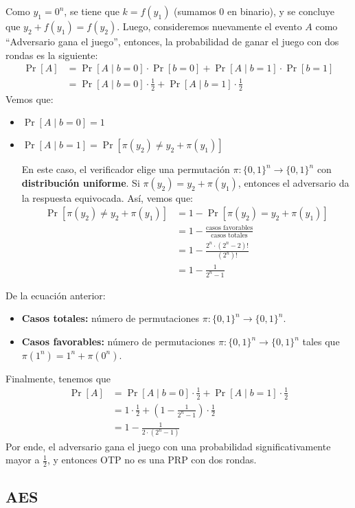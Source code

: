 Como $y_1 = 0^n$, se tiene que $k = f(y_1)$ (sumamos 0 en binario), y se concluye que $y_2 + f(y_1) = f(y_2)$. Luego, consideremos nuevamente el evento $A$ como ``Adversario gana el juego'', entonces, la probabilidad de ganar el juego con dos rondas es la siguiente:
\begin{align*}
    \Pr[A] & = \Pr[A \mid b = 0] \cdot \Pr[b = 0] + \Pr[A \mid b = 1] \cdot \Pr[b = 1]   \\
           & = \Pr[A \mid b = 0] \cdot \frac{1}{2} + \Pr[A \mid b = 1] \cdot \frac{1}{2}
\end{align*}
Vemos que:
\begin{itemize}
    \item $\Pr[A \mid b = 0] = 1$
    \item $\Pr[A \mid b = 1] = \Pr[\pi(y_2) \neq y_2 + \pi(y_1)]$
    
    En este caso, el verificador elige una permutación $\pi:\{0,1\}^n \to \{0,1\}^n$ con \textbf{distribución uniforme}. Si $\pi(y_2) = y_2 + \pi(y_1)$, entonces el adversario da la respuesta equivocada. Así, vemos que:
    \begin{align*}
        \Pr[\pi(y_2) \neq y_2 + \pi(y_1)] &= 1 - \Pr[\pi(y_2) = y_2 + \pi(y_1)] \\
        &= 1 - \frac{\text{casos favorables}}{\text{casos totales}} \\ 
        &= 1 - \frac{2^n \cdot (2^n - 2)!}{(2^n)!} \\
        &= 1 - \frac{1}{2^n - 1}
    \end{align*}
\end{itemize}
De la ecuación anterior:
\begin{itemize}
    \item \textbf{Casos totales:} número de permutaciones $\pi:\{0,1\}^n\to\{0,1\}^n$.
    \item \textbf{Casos favorables:} número de permutaciones $\pi:\{0,1\}^n\to\{0,1\}^n$ tales que $\pi(1^n) = 1^n + \pi(0^n)$.
\end{itemize}
Finalmente, tenemos que
\begin{align*}
    \Pr[A] & = \Pr[A \mid b = 0] \cdot \frac{1}{2} + \Pr[A \mid b = 1] \cdot \frac{1}{2} \\
           & = 1 \cdot \frac{1}{2} + \left(1 - \frac{1}{2^n - 1}\right) \cdot \frac{1}{2}    \\
           & = 1 - \frac{1}{2 \cdot (2^n - 1)}
\end{align*}
Por ende, el adversario gana el juego con una probabilidad significativamente mayor a $\frac{1}{2}$, y entonces OTP no es una PRP con dos rondas.

\subsection{AES}
